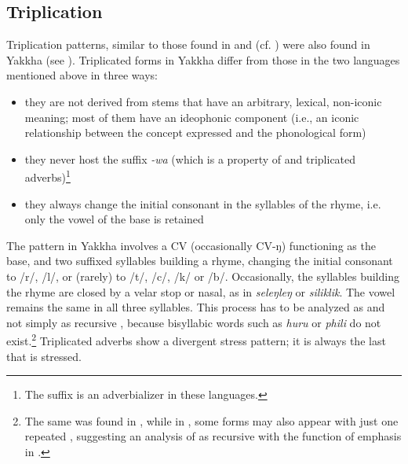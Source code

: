 \subsection{Triplication}\label{sec-trip}

Triplication patterns, similar to those found in  and  (cf. \citealt{Rai1984A-descriptive, Raietal1997Triplicated, Raietal2005Triplication}) were also found in Yakkha (see ). Triplicated forms in Yakkha differ from those in the two  languages mentioned above in three ways: 

\begin{itemize}
\item  they are not derived from stems that have an arbitrary, lexical, non-iconic meaning; most of them have an ideophonic component (i.e., an iconic relationship between the concept expressed and the phonological form)
\item  they never host the suffix \emph{-wa} (which is a property of  and  triplicated adverbs)\footnote{The suffix is an adverbializer in these languages.}
\item they always change the initial consonant in the syllables of the rhyme, i.e. only the vowel of the base is retained
\end{itemize}


The  pattern in Yakkha involves a  CV (occasionally CV-ŋ) functioning as the base, and two suffixed syllables building a rhyme, changing the initial consonant to /r/, /l/, or (rarely) to /t/, /c/, /k/ or /b/. Occasionally, the syllables building the rhyme are closed by a velar stop or nasal, as in \emph{seleŋleŋ} or \emph{siliklik}. The vowel remains the same in all three syllables. This process has to be analyzed as  and not simply as recursive , because bisyllabic words such as \emph{huru} or \emph{phili} do not exist.\footnote{The same was found in  \citep{Raietal2005Triplication}, while in  , some forms may also appear with just one repeated , suggesting an analysis of  as recursive  with the function of emphasis in  \citep[304]{Doornenbal2009A-grammar}.} Triplicated adverbs show a divergent stress pattern; it is always the last  that is stressed.


